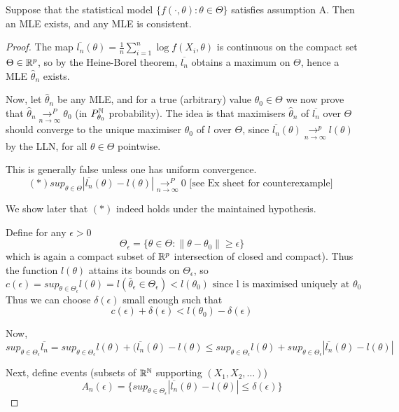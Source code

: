 \documentclass[a4paper]{article}
\begin{document}
\begin{thm}
	Suppose that the statistical model $\{f\left( \cdot , \theta \right) : \theta \in \Theta \}$ satisfies assumption A. Then an MLE exists, and any MLE is consistent.
\end{thm}

\begin{proof}
	The map $\overline{l_{n}}(\theta) = \frac{1}{n} \sum_{i=1}^{n} \log f(X_i, \theta)$ is continuous on the compact set $\Theta \in \mathbb{R}^{p}$, so by the Heine-Borel theorem, $\overline{l_n}$ obtains a maximum on $\Theta$, hence a MLE  $\hat{\theta}_n $ exists.

	Now, let  $\hat{\theta}_n$ be any MLE, and for a true (arbitrary) value $\theta_0 \in \Theta$ we now prove that $\hat{\theta}_n \underset{n\to \infty}{\to ^{P}} \theta_0$ (in $P_{\theta_0}^{\mathbb{N}}$ probability). The idea is that maximisers $\hat{\theta}_n$ of $\overline{l_n}$ over $\Theta$ should converge to the unique maximiser  $\theta_0$ of $l$ over $\Theta$, since  $\overline{l_n}(\theta) \underset{n\to \infty}{\to ^{p}} l(\theta)$ by the LLN, for all $\theta \in  \Theta$ pointwise.

	This is generally false unless one has uniform convergence.
	\[
		(\ast) sup_{\theta \in \Theta} |\overline{l_n}(\theta) - l(\theta)| \underset{n\to \infty}{\to ^{P}} 0 \text{ [see Ex sheet for counterexample] }
	\] 

	We show later that $(\ast)$ indeed holds under the maintained hypothesis.

	Define for any $\epsilon > 0$ 
	\[
		\Theta_{\epsilon} = \{\theta \in  \Theta : \|\theta - \theta_0\| \ge \epsilon\} 
	\] 
	which is again a compact subset of $\mathbb{R}^{p}$ intersection of closed and compact). Thus the function $l(\theta)$ attains its bounds on  $\Theta_{\epsilon}$, so
	\[
		c(\epsilon) = sup_{\theta \in \Theta_{\epsilon}} l(\theta) = l(\overline{\theta}_{\epsilon} \in \Theta_{\epsilon}) < l(\theta_0) \text{ since l is maximised uniquely at } \theta_0
	\] 
	Thus we can choose $\delta(\epsilon)$ small enough such that 
	 \[
	 c(\epsilon) + \delta(\epsilon) < l(\theta_0) - \delta(\epsilon) \tag{\dag}
	\]

	Now, $sup_{\theta \in  \Theta_{\epsilon}} \overline{l_n} = sup_{\theta \in \Theta_{\epsilon}} l(\theta) + (\overline{l_n}(\theta) - l(\theta) \le sup_{\theta \in \Theta_{\epsilon}} l(\theta) + sup_{\theta \in \Theta_{\epsilon}} |\overline{l_n} (\theta) - l(\theta)|$

	Next, define events (subsets of $\mathbb{R}^{\mathbb{N}}$ supporting $(X_1, X_2,\ldots)$) 
	\[
		A_n(\epsilon) = \{sup_{\theta \in \Theta_{\epsilon}} |\overline{l_n}(\theta) - l(\theta) | \le  \delta(\epsilon)\} 
	\] 


\end{proof}
\end{document}
